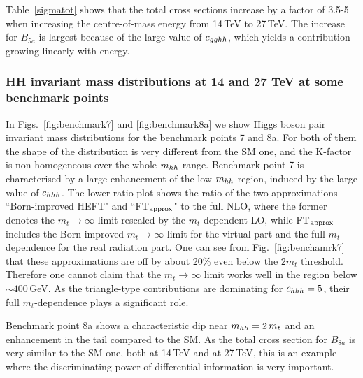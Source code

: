 %
Table~\ref{sigmatot} shows that the total cross sections increase by a factor of 3.5-5 when increasing the centre-of-mass energy from 14\,TeV to 27\,TeV. The increase for $B_{5a}$ is largest because of the large value of $c_{gghh}$, which yields a contribution growing linearly with energy.



\subsubsection{HH  invariant mass distributions at 14 and 27 TeV at some benchmark points}

In Figs.~\ref{fig:benchmark7} and \ref{fig:benchmark8a} we show Higgs boson pair invariant mass distributions for the benchmark points 7 and 8a. 
For both of them the shape of the distribution is very different from the SM one, and the K-factor is non-homogeneous over the whole $m_{hh}$-range. Benchmark point 7 is characterised by a large enhancement of the low $m_{hh}$ region, induced by the large value of $c_{hhh}$. The lower ratio plot shows the ratio of the two approximations ``Born-improved HEFT" and ``FT$_{\rm{approx}}$" to the full NLO, where the former denotes the $m_t\to\infty$ limit rescaled by the $m_t$-dependent LO, while FT$_{\rm{approx}}$ includes the Born-improved $m_t\to\infty$ limit for the virtual part and the full $m_t$-dependence for the real radiation part. One can see from Fig.~\ref{fig:benchamrk7} that these approximations are off by about 20\% even below the $2m_t$ threshold. Therefore one cannot claim that the $m_t\to \infty$ limit works well in the region below $\sim 400$\,GeV. As the triangle-type contributions are dominating for $c_{hhh}=5$, their full $m_t$-dependence plays a significant role. 

Benchmark point 8a shows a characteristic dip near $m_{hh}=2\,m_t$ and an enhancement in the tail compared to the SM. 
As the total cross section for $B_{8a}$ is very similar to the SM one, both at 14\,TeV and at 27\,TeV, this is an example where the discriminating power of differential information is very important.


